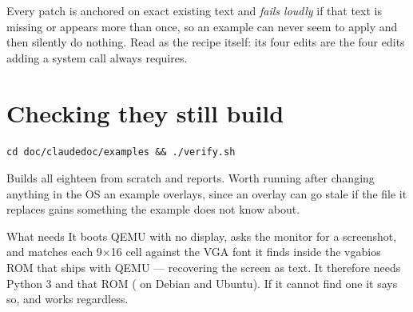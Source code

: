 Every patch is anchored on exact existing text and \emph{fails loudly} if that text is missing or
appears more than once, so an example can never seem to apply and then silently do nothing. Read
 as the recipe itself: its four edits are the four edits
adding a system call always requires.

\section{Checking they still build}

\begin{lstlisting}[style=sh]
cd doc/claudedoc/examples && ./verify.sh
\end{lstlisting}

Builds all eighteen from scratch and reports. Worth running after changing anything in the OS an
example overlays, since an overlay can go stale if the file it replaces gains something the example
does not know about.

\begin{warn}{What  needs}
It boots QEMU with no display, asks the monitor for a screenshot, and matches each 9$\times$16 cell
against the VGA font it finds inside the vgabios ROM that ships with QEMU --- recovering the screen
as text. It therefore needs Python 3 and that ROM
( on Debian and Ubuntu). If it cannot find one it says
so, and  works regardless.
\end{warn}
